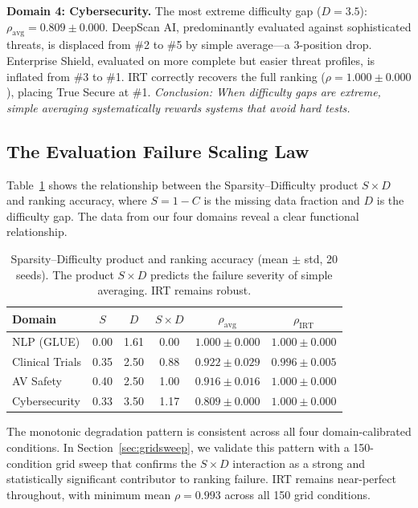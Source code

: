\documentclass[11pt,a4paper]{article}
\begin{document}
\textbf{Domain 4: Cybersecurity.} The most extreme difficulty gap ($D = 3.5$): $\rho_{\text{avg}} = 0.809 \pm 0.000$. DeepScan AI, predominantly evaluated against sophisticated threats, is displaced from \#2 to \#5 by simple average---a 3-position drop. Enterprise Shield, evaluated on more complete but easier threat profiles, is inflated from \#3 to \#1. IRT correctly recovers the full ranking ($\rho = 1.000 \pm 0.000$), placing True Secure at \#1. \emph{Conclusion: When difficulty gaps are extreme, simple averaging systematically rewards systems that avoid hard tests.}

\subsection{The Evaluation Failure Scaling Law}

Table~\ref{tab:scaling} shows the relationship between the Sparsity--Difficulty product $S \times D$ and ranking accuracy, where $S = 1 - C$ is the missing data fraction and $D$ is the difficulty gap. The data from our four domains reveal a clear functional relationship.

\begin{table}[t]
\centering
\caption{Sparsity--Difficulty product and ranking accuracy (mean $\pm$ std, 20 seeds). The product $S \times D$ predicts the failure severity of simple averaging. IRT remains robust.}
\label{tab:scaling}
\small
\begin{tabular}{lccccc}
\toprule
Domain & $S$ & $D$ & $S \times D$ & $\rho_{\text{avg}}$ & $\rho_{\text{IRT}}$ \\
\midrule
NLP (GLUE) & 0.00 & 1.61 & 0.00 & $1.000 \pm 0.000$ & $1.000 \pm 0.000$ \\
Clinical Trials & 0.35 & 2.50 & 0.88 & $0.922 \pm 0.029$ & $0.996 \pm 0.005$ \\
AV Safety & 0.40 & 2.50 & 1.00 & $0.916 \pm 0.016$ & $1.000 \pm 0.000$ \\
Cybersecurity & 0.33 & 3.50 & 1.17 & $0.809 \pm 0.000$ & $1.000 \pm 0.000$ \\
\bottomrule
\end{tabular}
\end{table}

The monotonic degradation pattern is consistent across all four domain-calibrated conditions. In Section~\ref{sec:gridsweep}, we validate this pattern with a 150-condition grid sweep that confirms the $S \times D$ interaction as a strong and statistically significant contributor to ranking failure. IRT remains near-perfect throughout, with minimum mean $\rho = 0.993$ across all 150 grid conditions.
\end{document}

